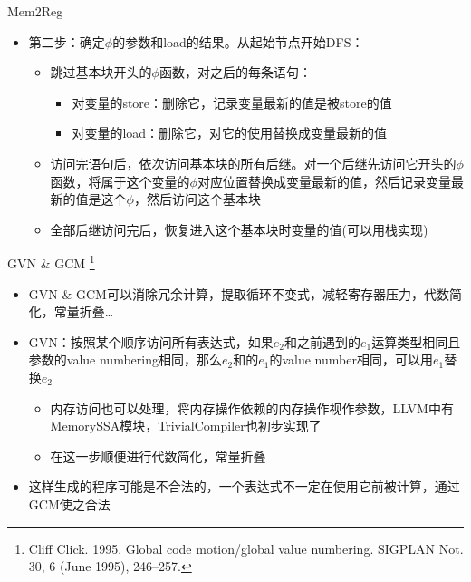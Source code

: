 \documentclass{beamer}
\begin{document}
\begin{frame}{Mem2Reg}
\begin{itemize}
  \item 第二步：确定$\phi$的参数和load的结果。从起始节点开始DFS：
  \begin{itemize}
    \item 跳过基本块开头的$\phi$函数，对之后的每条语句：
    \begin{itemize}
      \item 对变量的store：删除它，记录变量最新的值是被store的值
      \item 对变量的load：删除它，对它的使用替换成变量最新的值
    \end{itemize}
    \item 访问完语句后，依次访问基本块的所有后继。对一个后继先访问它开头的$\phi$函数，将属于这个变量的$\phi$对应位置替换成变量最新的值，然后记录变量最新的值是这个$\phi$，然后访问这个基本块
    \item 全部后继访问完后，恢复进入这个基本块时变量的值(可以用栈实现)
  \end{itemize}
\end{itemize}
\end{frame}

\begin{frame}{GVN \& GCM \footnote[1]{Cliff Click. 1995. Global code motion/global value numbering. SIGPLAN Not. 30, 6 (June 1995), 246–257.}}
\begin{itemize}
  \item GVN \& GCM可以消除冗余计算，提取循环不变式，减轻寄存器压力，代数简化，常量折叠\ldots
  \item GVN：按照某个顺序访问所有表达式，如果$e_2$和之前遇到的$e_1$运算类型相同且参数的value numbering相同，那么$e_2$和的$e_1$的value number相同，可以用$e_1$替换$e_2$
  \begin{itemize}
    \item 内存访问也可以处理，将内存操作依赖的内存操作视作参数，LLVM中有MemorySSA模块，TrivialCompiler也初步实现了
    \item 在这一步顺便进行代数简化，常量折叠
  \end{itemize}
  \item 这样生成的程序可能是不合法的，一个表达式不一定在使用它前被计算，通过GCM使之合法
\end{itemize}
\end{frame}
\end{document}
